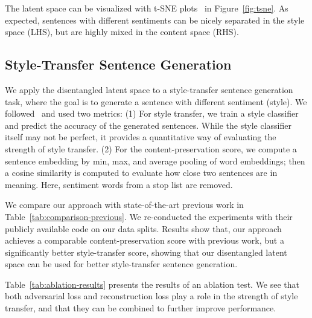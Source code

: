 \documentclass[11pt,a4paper]{article}
\begin{document}
The latent space can be visualized with t-SNE plots~\cite{maaten2008visualizing} in Figure~\ref{fig:tsne}. As expected, sentences with different sentiments can be nicely separated in the style space (LHS), but are highly mixed in the content space (RHS).


\subsection{Style-Transfer Sentence Generation}

We apply the disentangled latent space to a style-transfer sentence generation task, where the goal is to generate a sentence with different sentiment (style). We followed~ and used two metrics: (1) For style transfer, we train a style classifier and predict the accuracy of the generated sentences. While the style classifier itself may not be perfect, it provides a quantitative way of evaluating the strength of style transfer. (2) For the content-preservation score, we compute a sentence embedding by min, max, and average pooling of word embeddings; then a cosine similarity is computed to evaluate how close two sentences are in meaning. Here, sentiment words from a stop list \cite{hu2004mining} are removed.

We compare our approach with state-of-the-art previous work in Table~\ref{tab:comparison-previous}. We re-conducted the experiments with their publicly available code on our data splits.
Results show that, our approach achieves a comparable content-preservation score with previous work, but a significantly better style-transfer score, showing that our disentangled latent space can be used for better style-transfer sentence generation.

Table~\ref{tab:ablation-results} presents the results of an ablation test. We see that both adversarial loss and reconstruction loss play a role in the strength of style transfer, and that they can be combined to further improve performance.

\end{document}
